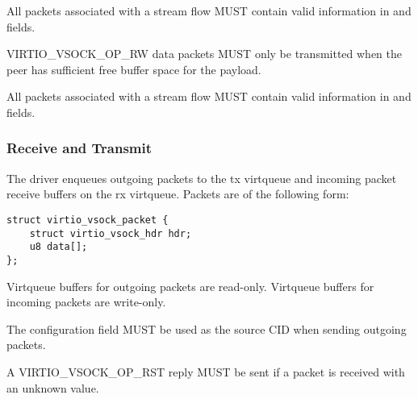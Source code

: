 All packets associated with a stream flow MUST contain valid information in
 and  fields.

VIRTIO_VSOCK_OP_RW data packets MUST only be transmitted when the peer has
sufficient free buffer space for the payload.

All packets associated with a stream flow MUST contain valid information in
 and  fields.

\subsubsection{Receive and Transmit}\label{sec:Device Types / Socket Device / Device Operation / Receive and Transmit}
The driver enqueues outgoing packets to the tx virtqueue and incoming packet
receive buffers on the rx virtqueue. Packets are of the following form:

\begin{lstlisting}
struct virtio_vsock_packet {
    struct virtio_vsock_hdr hdr;
    u8 data[];
};
\end{lstlisting}

Virtqueue buffers for outgoing packets are read-only. Virtqueue buffers for
incoming packets are write-only.


The  configuration field MUST be used as the source CID when
sending outgoing packets.

A VIRTIO_VSOCK_OP_RST reply MUST be sent if a packet is received with an
unknown  value.


